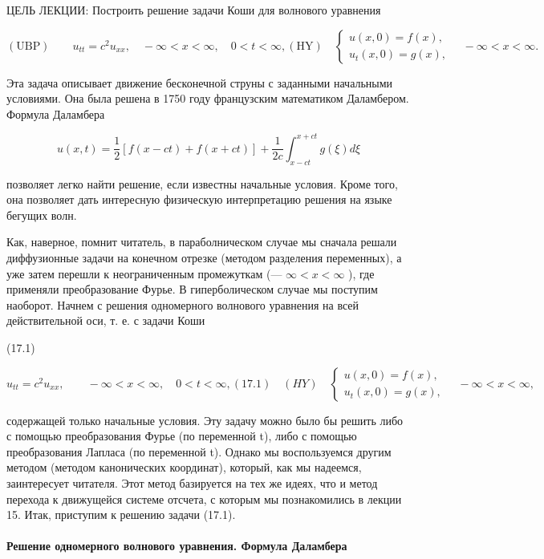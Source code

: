 \documentclass[
  ukrainian,
]{article}
\begin{document}
ЦЕЛЬ ЛЕКЦИИ: Построить решение задачи Коши для волнового уравнения

\[
(\text{UBP}) \qquad u_{tt} = c^2 u_{xx}, \quad -\infty < x < \infty, \quad 0 < t < \infty,
(\text{HY}) \quad \begin{cases} u(x, 0) = f(x), \\ u_t(x, 0) = g(x), \end{cases} \quad -\infty < x < \infty.
\]

Эта задача описывает движение бесконечной струны с заданными начальными
условиями. Она была решена в 1750 году французским математиком
Даламбером. Формула Даламбера

\[
u(x, t) = \frac{1}{2} [f(x - ct) + f(x + ct)] + \frac{1}{2c} \int_{x-ct}^{x+ct} g(\xi) d\xi
\]

позволяет легко найти решение, если известны начальные условия. Кроме
того, она позволяет дать интересную физическую интерпретацию решения на
языке бегущих волн.

Как, наверное, помнит читатель, в параболническом случае мы сначала
решали диффузионные задачи на конечном отрезке (методом разделения
переменных), а уже затем перешли к неограниченным промежуткам (---
\(\infty < x < \infty\) ), где применяли преобразование Фурье. В
гиперболическом случае мы поступим наоборот. Начнем с решения
одномерного волнового уравнения на всей действительной оси, т. е. с
задачи Коши

(17.1)

\[
u_{tt} = c^{2}u_{xx}, \qquad -\infty < x < \infty, \quad 0 < t < \infty,
(17.1) \quad (HY) \quad \begin{cases} u(x, 0) = f(x), \\ u_{t}(x, 0) = g(x), \end{cases} \quad -\infty < x < \infty,
\]

содержащей только начальные условия. Эту задачу можно было бы решить
либо с помощью преобразования Фурье (по переменной t), либо с помощью
преобразования Лапласа (по переменной t). Однако мы воспользуемся другим
методом (методом канонических координат), который, как мы надеемся,
заинтересует читателя. Этот метод базируется на тех же идеях, что и
метод перехода к движущейся системе отсчета, с которым мы познакомились
в лекции 15. Итак, приступим к решению задачи (17.1).

\paragraph{Решение одномерного волнового уравнения. Формула
Даламбера}\label{ux440ux435ux448ux435ux43dux438ux435-ux43eux434ux43dux43eux43cux435ux440ux43dux43eux433ux43e-ux432ux43eux43bux43dux43eux432ux43eux433ux43e-ux443ux440ux430ux432ux43dux435ux43dux438ux44f.-ux444ux43eux440ux43cux443ux43bux430-ux434ux430ux43bux430ux43cux431ux435ux440ux430}
\end{document}
